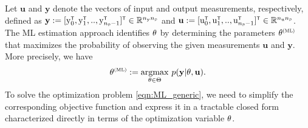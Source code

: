 \fi
Let $\mathbf{u}$ and $\mathbf{y}$ denote the vectors of input and output measurements, respectively, defined as $\mathbf{y} := [\vcy_0^\tr,\vcy_1^\tr,..,\vcy_{{\nsD-1}}^\tr]^\tr\in\Rbb^{\Ny\nsD}$ and $\mathbf{u} := [\vcu_0^\tr,\vcu_1^\tr,..,\vcu_{\nsD-1}^\tr]^\tr\in\Rbb^{\Nu\nsD}$. The ML estimation approach identifies ${ \mathrm{\theta} }$ by determining the 
parameters $\vcthetaML$ that maximizes the probability of observing the given measurements $\mathbf{u}$ and $\mathbf{y}$. 
More precisely, we have 
\begin{equation} \label{eqn:ML_generic}
    \vcthetaML  := \argmaxOp_{\vctheta \in \Theta}\, p(\mathbf{y}|\vctheta, \mathbf{u}).
\end{equation} 
To solve the optimization problem \eqref{eqn:ML_generic}, we need to simplify the corresponding objective function
and express it in a tractable closed form characterized directly in terms of the optimization variable ${ \mathrm{\theta} }$.


